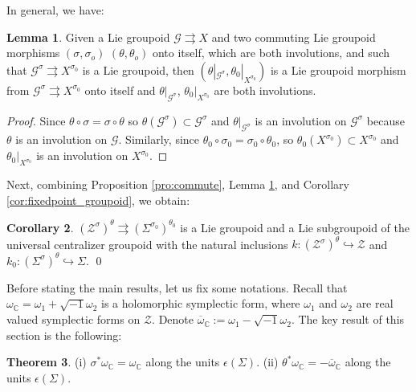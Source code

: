\documentclass[a4paper,12pt,leqno]{amsart}
\numberwithin{equation}{section}
\theoremstyle{plain}
\theoremstyle{definition}
\newcommand{\cZ}{\mathcal{Z}}
\newcommand{\cG}{\mathcal{G}}
\newcommand{\bC}{\mathbb{C}}
\newtheorem{thm}{Theorem}[section]
\newtheorem{lm}[thm]{Lemma}
\newtheorem{cor}[thm]{Corollary}
\begin{document}
In general, we have:
\begin{lm}\label{lm:commute}
Given a Lie groupoid $\cG\rightrightarrows X$ and two commuting Lie groupoid morphisms $(\sigma,\sigma_o)$ $(\theta,\theta_o)$ onto itself, which are both involutions, and such that $\cG^\sigma\rightrightarrows X^{\sigma_0}$ is a Lie groupoid, then $(\theta|_{\cG^\sigma},\theta_0|_{X^{\sigma_0}})$ is a Lie groupoid morphism from $\cG^\sigma\rightrightarrows X^{\sigma_0}$ onto itself and $\theta|_{\cG^\sigma}$, $\theta_0|_{X^{\sigma_0}}$ are both involutions.
\end{lm}
\begin{proof}
Since $\theta\circ\sigma=\sigma\circ\theta$ so $\theta(\cG^\sigma)\subset \cG^\sigma$ and $\theta|_{\cG^\sigma}$ is an involution on $\cG^\sigma$ because $\theta$ is an involution on $\cG$. Similarly, since $\theta_0\circ\sigma_0=\sigma_0\circ\theta_0$, so $\theta_0(X^{\sigma_0})\subset X^{\sigma_0}$ and $\theta_0|_{X^{\sigma_0}}$ is an involution on $X^{\sigma_0}$. 
\end{proof}

Next, combining Proposition \ref{pro:commute}, Lemma \ref{lm:commute}, and Corollary \ref{cor:fixedpoint_groupoid}, we obtain:
\begin{cor}\label{cor:desired_groupoid}
$ (\cZ^{\sigma})^\theta \rightrightarrows (\Sigma^{\sigma_0})^{\theta_0} $ is a Lie groupoid and a Lie subgroupoid of the universal centralizer groupoid with the natural inclusions $k: (\cZ^{\sigma})^\theta\hookrightarrow \cZ$ and  $k_0: (\Sigma^{\sigma})^{\theta}\hookrightarrow \Sigma$.
\qed
\end{cor}

Before stating the main results, let us fix some notations. Recall that $\omega_\bC=\omega_1+\sqrt{-1}\omega_2$ is a holomorphic symplectic form, where $\omega_1$ and $\omega_2$ are real valued symplectic forms on $\cZ$.
Denote $\overline{\omega}_\bC:=\omega_1-\sqrt{-1}\omega_2$. 
The key result of this section is the following:

\begin{thm}\label{thm:main}
(i) $\sigma^*\omega_\bC=\omega_\bC$ along the units $\epsilon(\Sigma)$. (ii) $\theta^*\omega_{\bC}=-\overline{\omega}_\bC$ along the units $\epsilon(\Sigma)$.
\end{thm}
\end{document}
